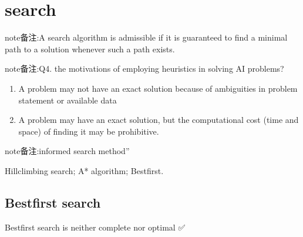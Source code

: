 \documentclass[letterpaper,10pt,english]{sphinxmanual}
\begin{document}
\section{search}
\label{\detokenize{AI/main:search}}
\begin{sphinxadmonition}{note}{备注:}{A search algorithm is admissible if it is guaranteed to find a minimal path to a solution whenever such a path exists.}
\end{sphinxadmonition}

\begin{sphinxadmonition}{note}{备注:}{Q4. the motivations of employing heuristics in solving AI problems?}
\begin{enumerate}
%
\item {} 
\sphinxAtStartPar
A problem may not have an exact solution because of ambiguities in problem statement or available data

\item {} 
\sphinxAtStartPar
A problem may have an exact solution, but the computational cost (time and space) of finding it may be prohibitive.

\end{enumerate}
\end{sphinxadmonition}

\begin{sphinxadmonition}{note}{备注:}{informed search method”}

\sphinxAtStartPar
Hill\sphinxhyphen{}climbing search; A* algorithm; Best\sphinxhyphen{}first.
\end{sphinxadmonition}


\subsection{Best\sphinxhyphen{}first search}
\label{\detokenize{AI/main:best-first-search}}
\sphinxAtStartPar
Best\sphinxhyphen{}first search is neither complete nor optimal ✅

\noindent{}
\end{document}

